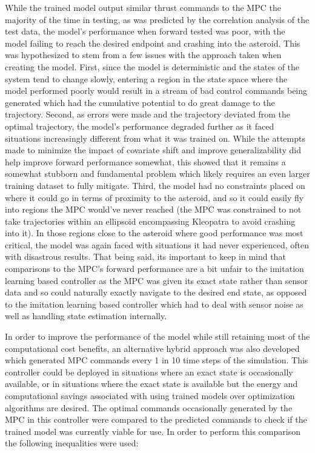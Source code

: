 \documentclass[twocolumn,letterpaper]{IEEEAerospaceCLS}
\begin{document}
While the trained model output similar thrust commands to the MPC the majority of the time in testing, as was predicted by the correlation analysis of the test data, the model's performance when forward tested was poor, with the model failing to reach the desired endpoint and crashing into the asteroid. This was hypothesized to stem from a few issues with the approach taken when creating the model. First, since the model is deterministic and the states of the system tend to change slowly, entering a region in the state space where the model performed poorly would result in a stream of bad control commands being generated which had the cumulative potential to do great damage to the trajectory. Second, as errors were made and the trajectory deviated from the optimal trajectory, the model's performance degraded further as it faced situations increasingly different from what it was trained on. While the attempts made to minimize the impact of covariate shift and improve generalizability did help improve forward performance somewhat, this showed that it remains a somewhat stubborn and fundamental problem which likely requires an even larger training dataset to fully mitigate. Third, the model had no constraints placed on where it could go in terms of proximity to the asteroid, and so it could easily fly into regions the MPC would've never reached (the MPC was constrained to not take trajectories within an ellipsoid encompassing Kleopatra to avoid crashing into it). In those regions close to the asteroid where good performance was most critical, the model was again faced with situations it had never experienced, often with disastrous results. That being said, its important to keep in mind that comparisons to the MPC's forward performance are a bit unfair to the imitation learning based controller as the MPC was given its exact state rather than sensor data and so could naturally exactly navigate to the desired end state, as opposed to the imitation learning based controller which had to deal with sensor noise as well as handling state estimation internally. 


In order to improve the performance of the model while still retaining most of the computational cost benefits, an alternative hybrid approach was also developed which generated MPC commands every 1 in 10 time steps of the simulation. This controller could be deployed in situations where an exact state is occasionally available, or in situations where the exact state is available but the energy and computational savings associated with using trained models over optimization algorithms are desired. The optimal commands occasionally generated by the MPC in this controller were compared to the predicted commands to check if the trained model was currently viable for use. In order to perform this comparison the following inequalities were used: 
\end{document}
